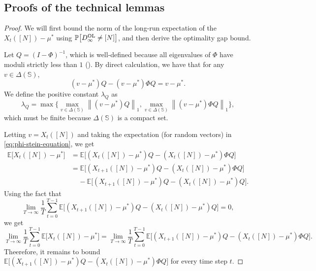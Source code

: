 \documentclass[11pt,letterpaper]{article}
\theoremstyle{plain}
\theoremstyle{definition}
\theoremstyle{remark}
\newcommand{\norm}[1]{\left\lVert#1\right\rVert}
\newcommand{\Ebig}[1]{\mathbb{E}\big[#1\big]}
\newcommand{\Probbig}[1]{\mathbb{P}\big[#1\big]}
\newcommand{\sspa}{\mathbb{S}}
\newcommand{\statdist}{\mu^*}
\newcommand{\Db}{D^{\textup{OL}}}
\newcommand{\lamq}{\lambda_{Q}}
\begin{document}
\subsection{Proofs of the technical lemmas}
\label{sec:two-set:pf-minor-lemmas}


\optgapbyprob*


\begin{proof}
    We will first bound the norm of the long-run expectation of the $X_t([N]) - \statdist$ using $\Probbig{\Db_\infty \neq [N]}$, and then derive the optimality gap bound. 
    
    Let $Q = (I - \Phi)^{-1}$, which is well-defined because all eigenvalues of $\Phi$ have moduli strictly less than $1$ (). 
    By direct calculation, we have that for any $v\in\Delta(\sspa)$,
    \begin{equation}\label{eq:phi-stein-equation}
        (v - \statdist) Q - (v - \statdist)\Phi Q = v - \statdist. 
    \end{equation}
    We define the positive constant $\lamq$ as
    \[
        \lamq = \max\Big\{\max_{v\in\Delta(\sspa)} \norm{(v-\statdist) Q}_1,  \max_{v\in\Delta(\sspa)} \norm{(v-\statdist) \Phi Q}_1\Big\},
    \]
    which must be finite because $\Delta(\sspa)$ is a compact set.
    
    
    Letting $v = X_t([N])$ and taking the expectation (for random vectors) in \eqref{eq:phi-stein-equation}, we get
    \begin{align}
        \Ebig{X_t([N]) - \statdist}
        \nonumber
        &= \Ebig{(X_t([N])-\statdist)Q - (X_t([N])-\statdist)\Phi Q} \\
        \nonumber
        &= \Ebig{(X_{t+1}([N])-\statdist)Q - (X_t([N])-\statdist)\Phi Q} \\
        \nonumber
        &\mspace{20mu} - \Ebig{(X_{t+1}([N])-\statdist)Q - (X_t([N])-\statdist)Q}.
    \end{align}
    Using the fact that 
    \[
         \lim_{T\to\infty} \frac{1}{T} \sum_{t=0}^{T-1} \Ebig{(X_{t+1}([N])-\statdist)Q - (X_t([N])-\statdist)Q} = 0,  
    \]
    we get 
    \begin{equation}\label{eq:two-set:state-diff-steins-diff}
        \lim_{T\to\infty} \frac{1}{T} \sum_{t=0}^{T-1} \Ebig{X_t([N]) - \statdist} = \lim_{T\to\infty} \frac{1}{T} \sum_{t=0}^{T-1} \Ebig{(X_{t+1}([N])-\statdist)Q - (X_t([N])-\statdist)\Phi Q}.
    \end{equation} 
    Theerefore, it remains to bound $\Ebig{(X_{t+1}([N])-\statdist)Q - (X_t([N])-\statdist)\Phi Q}$ for every time step $t$. 
    

\end{proof}
\end{document}
